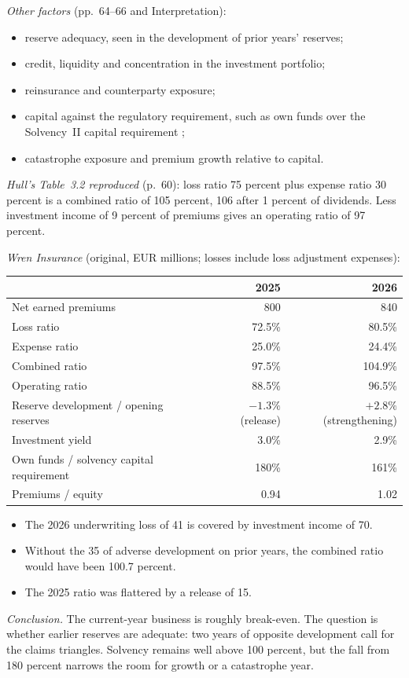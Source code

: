 \begin{qfmethod}
\emph{Other factors} (pp.~64--66 and Interpretation):
\begin{itemize}
\item reserve adequacy, seen in the development of prior years' reserves;
\item credit, liquidity and concentration in the investment portfolio;
\item reinsurance and counterparty exposure;
\item capital against the regulatory requirement, such as own funds over the Solvency~II capital requirement \citep[pp.~557--558]{risk-management-financial-institutions-2023};
\item catastrophe exposure and premium growth relative to capital.
\end{itemize}

 \emph{Hull's Table~3.2 reproduced} (p.~60): loss ratio 75 percent plus expense ratio 30 percent is a combined ratio of 105 percent, 106 after 1 percent of dividends. Less investment income of 9 percent of premiums gives an operating ratio of 97 percent.

\emph{Wren Insurance} (original, EUR millions; losses include loss adjustment expenses):
\begin{center}\small
\begin{tabular}{@{}lrr@{}}
\toprule
 & 2025 & 2026 \\
\midrule
Net earned premiums & 800 & 840 \\
Loss ratio & 72.5\% & 80.5\% \\
Expense ratio & 25.0\% & 24.4\% \\
Combined ratio & 97.5\% & 104.9\% \\
Operating ratio & 88.5\% & 96.5\% \\
Reserve development / opening reserves & $-1.3\%$ (release) & $+2.8\%$ (strengthening) \\
Investment yield & 3.0\% & 2.9\% \\
Own funds / solvency capital requirement & 180\% & 161\% \\
Premiums / equity & 0.94 & 1.02 \\
\bottomrule
\end{tabular}
\end{center}
\begin{itemize}
\item The 2026 underwriting loss of 41 is covered by investment income of 70.
\item Without the 35 of adverse development on prior years, the combined ratio would have been 100.7 percent.
\item The 2025 ratio was flattered by a release of 15.
\end{itemize}
\emph{Conclusion.} The current-year business is roughly break-even. The question is whether earlier reserves are adequate: two years of opposite development call for the claims triangles. Solvency remains well above 100 percent, but the fall from 180 percent narrows the room for growth or a catastrophe year.


\end{qfmethod}
